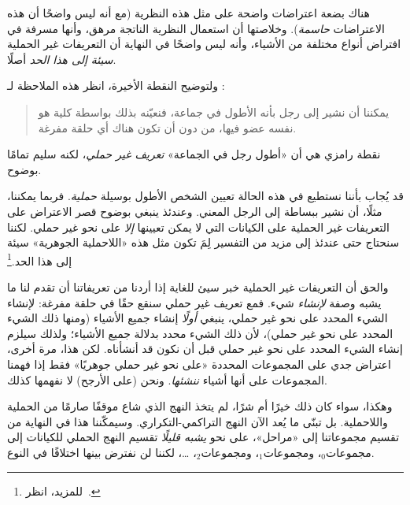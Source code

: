 \documentclass[../../../include/open-logic-section]{subfiles}
\begin{document}
هناك بضعة اعتراضات واضحة على مثل هذه النظرية (مع أنه ليس واضحًا أن
هذه الاعتراضات \emph{حاسمة}). وخلاصتها أن استعمال النظرية الناتجة
مرهق، وأنها مسرفة في افتراض أنواع مختلفة من الأشياء، وأنه ليس واضحًا
في النهاية أن التعريفات غير الحملية \emph{سيئة إلى هذا الحد} أصلًا.
	
ولتوضيح النقطة الأخيرة، انظر هذه الملاحظة لـ
\citeauthor{Ramsey1925}:
\begin{quote}
	يمكننا أن نشير إلى رجل بأنه الأطول في جماعة، فنعيّنه بذلك بواسطة
	كلية هو نفسه عضو فيها، من دون أن تكون هناك أي حلقة مفرغة.
	\citep{Ramsey1925}
\end{quote}
نقطة رامزي هي أن «أطول رجل في الجماعة» \emph{تعريف غير حملي}، لكنه
سليم تمامًا بوضوح.

قد يُجاب بأننا نستطيع في هذه الحالة تعيين الشخص الأطول بوسيلة
\emph{حملية}. فربما يمكننا، مثلًا، أن نشير ببساطة إلى الرجل المعني.
وعندئذ ينبغي بوضوح قصر الاعتراض على التعريفات غير الحملية على الكيانات
التي لا يمكن تعيينها \emph{إلا} على نحو غير حملي. لكننا سنحتاج حتى
عندئذ إلى مزيد من التفسير لِمَ تكون مثل هذه «اللاحملية الجوهرية» سيئة
إلى هذا الحد.\footnote{للمزيد، انظر~\citet{Linnebo2010}.}

والحق أن التعريفات غير الحملية خبر سيئ للغاية إذا أردنا من تعريفاتنا
أن تقدم لنا ما يشبه وصفة \emph{لإنشاء} شيء. فمع تعريف غير حملي سنقع
حقًا في حلقة مفرغة: لإنشاء الشيء المحدد على نحو غير حملي، ينبغي
\emph{أولًا} إنشاء جميع الأشياء (ومنها ذلك الشيء المحدد على نحو غير
حملي)، لأن ذلك الشيء محدد بدلالة جميع الأشياء؛ ولذلك سيلزم إنشاء الشيء
المحدد على نحو غير حملي قبل أن نكون قد أنشأناه. لكن هذا، مرة أخرى،
اعتراض جدي على المجموعات المحددة «على نحو غير حملي جوهريًا» فقط إذا
فهمنا المجموعات على أنها أشياء \emph{ننشئها}. ونحن (على الأرجح) لا
نفهمها كذلك.

وهكذا، سواء كان ذلك خيرًا أم شرًا، لم يتخذ النهج الذي شاع موقفًا صارمًا
من الحملية واللاحملية. بل تبنّى ما يُعد الآن النهج التراكمي-التكراري.
وسيمكّننا هذا في النهاية من تقسيم مجموعاتنا إلى «مراحل»، على نحو
\emph{يشبه قليلًا} تقسيم النهج الحملي للكيانات إلى مجموعات$_0$،
ومجموعات$_1$، ومجموعات$_2$، \ldots، لكننا لن نفترض بينها اختلافًا
في النوع.
\end{document}
